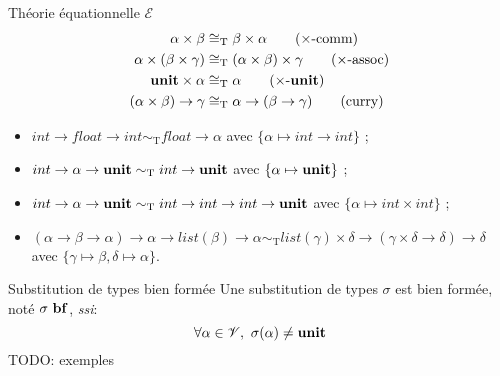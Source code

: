 \documentclass[serif]{beamer}
\newcommand{\ssi}{\textit{ssi}\xspace}
\newcommand{\unit}{\bold{unit}}
\newcommand{\V}{\mathscr{V}}
\newcommand{\E}{\mathscr{E}}
\newcommand{\T}{\mathrm{T}}
\begin{document}
\begin{frame}{Théorie équationnelle $\E$}
	\begin{align}
			\alpha \times \beta &\cong_\T
			\beta \times \alpha
			\label{prod_comm}
			\tag{$\times$-comm}
		\\
			\alpha \times (\beta \times \gamma) &\cong_\T
			(\alpha \times \beta) \times \gamma
			\label{prod_assoc}
			\tag{$\times$-assoc}
		\\
			\unit \times \alpha &\cong_\T
			\alpha
			\label{prod_unit}
			\tag{$\times$-$\unit$}
		\\
			(\alpha \times \beta) \rightarrow \gamma &\cong_\T
			\alpha \rightarrow (\beta \rightarrow \gamma)
			\label{curry}
			\tag{curry}
	\end{align}
	\begin{itemize}
		\item $int \rightarrow float \rightarrow int \sim_\T float \rightarrow \alpha$ avec $\{ \alpha \mapsto int \rightarrow int \}$ ;
		\item $int \rightarrow \alpha \rightarrow \unit \sim_\T int \rightarrow \unit$ avec $\{ \alpha \mapsto \unit \}$ ;
		\item $int \rightarrow \alpha \rightarrow \unit \sim_\T int \rightarrow int \rightarrow int \rightarrow \unit$ avec $\{ \alpha \mapsto int \times int \}$ ;
		\item $(\alpha \rightarrow \beta \rightarrow \alpha) \rightarrow \alpha \rightarrow list (\beta) \rightarrow \alpha \sim_\T list (\gamma) \times \delta \rightarrow (\gamma \times \delta \rightarrow \delta) \rightarrow \delta$ \\ avec $\{ \gamma \mapsto \beta, \delta \mapsto \alpha \}$.
	\end{itemize}
\end{frame}


\begin{frame}{Substitution de types bien formée}
	Une substitution de types $\sigma$ est bien formée, noté $\sigma\ \bold{bf}$, \ssi :
	\[ \forall \alpha \in \V,\ \sigma (\alpha) \neq \unit \]
	TODO: exemples
\end{frame}

\end{document}
